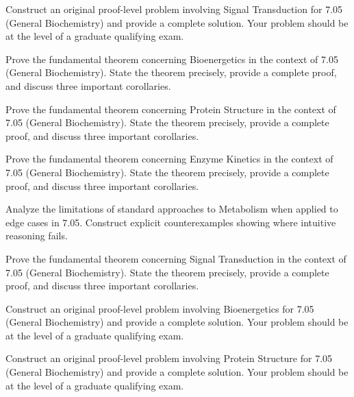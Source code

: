\documentclass[12pt,a4paper]{exam}
\begin{document}
\begin{questions}
\vspace{0.3cm}

\question[2]
Construct an original proof-level problem involving Signal Transduction for 7.05 (General Biochemistry) and provide a complete solution. Your problem should be at the level of a graduate qualifying exam.

\vspace{0.3cm}

\question[4]
Prove the fundamental theorem concerning Bioenergetics in the context of 7.05 (General Biochemistry). State the theorem precisely, provide a complete proof, and discuss three important corollaries.

\vspace{0.3cm}

\question[3]
Prove the fundamental theorem concerning Protein Structure in the context of 7.05 (General Biochemistry). State the theorem precisely, provide a complete proof, and discuss three important corollaries.

\vspace{0.3cm}

\question[2]
Prove the fundamental theorem concerning Enzyme Kinetics in the context of 7.05 (General Biochemistry). State the theorem precisely, provide a complete proof, and discuss three important corollaries.

\vspace{0.3cm}

\question[3]
Analyze the limitations of standard approaches to Metabolism when applied to edge cases in 7.05. Construct explicit counterexamples showing where intuitive reasoning fails.

\vspace{0.3cm}

\question[5]
Prove the fundamental theorem concerning Signal Transduction in the context of 7.05 (General Biochemistry). State the theorem precisely, provide a complete proof, and discuss three important corollaries.

\vspace{0.3cm}

\question[6]
Construct an original proof-level problem involving Bioenergetics for 7.05 (General Biochemistry) and provide a complete solution. Your problem should be at the level of a graduate qualifying exam.

\vspace{0.3cm}

\question[2]
Construct an original proof-level problem involving Protein Structure for 7.05 (General Biochemistry) and provide a complete solution. Your problem should be at the level of a graduate qualifying exam.


\end{questions}
\end{document}

